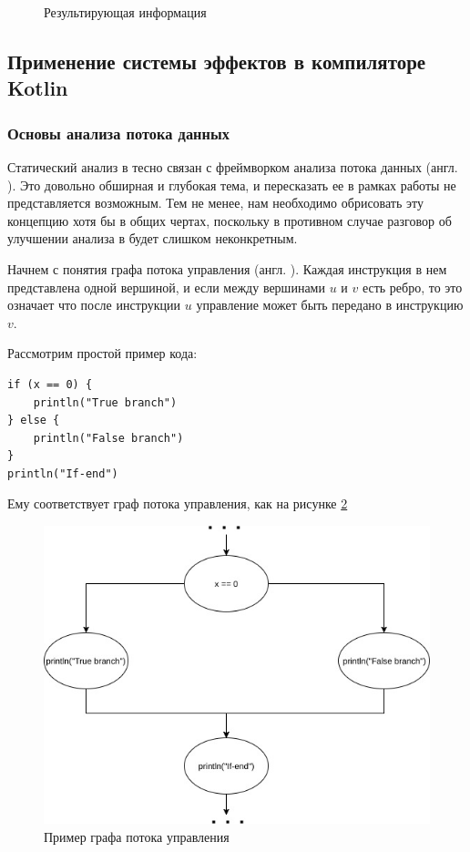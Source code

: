 \begin{figure}[H]

  \caption{Результирующая информация}
  \label{fig:info-holder}
\end{figure}


\subsection{Применение системы эффектов в компиляторе Kotlin}

\subsubsection{Основы анализа потока данных}

Статический анализ в  тесно связан с фреймворком анализа потока данных (англ. ). Это довольно обширная и глубокая тема, и пересказать ее в рамках работы не представляется возможным. Тем не менее, нам необходимо обрисовать эту концепцию хотя бы в общих чертах, поскольку в противном случае разговор об улучшении анализа в  будет слишком неконкретным.

Начнем с понятия графа потока управления (англ. ). Каждая инструкция в нем представлена одной вершиной, и если между вершинами $u$ и $v$ есть ребро, то это означает что после инструкции $u$ управление может быть передано
в инструкцию $v$.

Рассмотрим простой пример кода:

\begin{verbatim}
if (x == 0) {
    println("True branch")
} else {
    println("False branch")
}
println("If-end")
\end{verbatim}

Ему соответствует граф потока управления, как на рисунке \ref{control-flow-example}

\begin{figure}[h]
  \centering
  \includegraphics[scale=0.5]{img/control-flow-example}
  \caption{Пример графа потока управления}
  \label{control-flow-example}
\end{figure}


